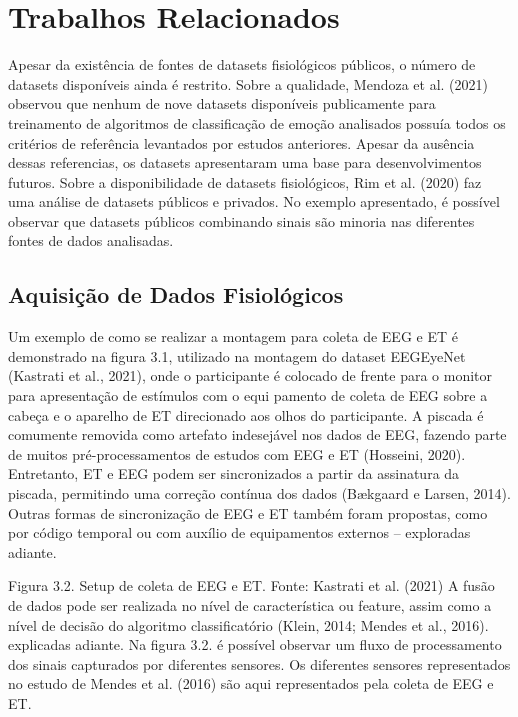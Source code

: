 \chapter{Trabalhos Relacionados}


Apesar da existência de fontes de datasets fisiológicos públicos, 
o número de datasets disponíveis ainda é restrito. Sobre a qualidade, 
Mendoza et al. (2021) observou que nenhum de nove datasets disponíveis publicamente para 
treinamento de algoritmos de classificação de emoção analisados possuía todos os critérios de 
referência levantados por estudos anteriores. Apesar da ausência dessas referencias, os datasets 
apresentaram uma base para desenvolvimentos futuros. Sobre a disponibilidade de datasets fisiológicos,
Rim et al. (2020) faz uma análise de datasets públicos e privados.
 No exemplo apresentado, 
 é possível observar que datasets públicos combinando sinais são minoria nas diferentes fontes de dados analisadas. 


\section{Aquisição de Dados Fisiológicos}

Um exemplo de como se realizar a montagem para coleta de EEG e ET é demonstrado na figura 3.1, utilizado na montagem do dataset EEGEyeNet (Kastrati et al., 2021),
onde o participante é colocado de frente para o monitor para apresentação de estímulos com o equi
pamento de coleta de EEG sobre a cabeça e o aparelho de ET direcionado aos olhos do participante. A piscada é comumente
removida como artefato indesejável nos dados de EEG, fazendo parte de muitos pré-processamentos de estudos com EEG e ET (Hosseini, 2020).
Entretanto, ET e EEG podem ser sincronizados a partir da assinatura da piscada, permitindo uma correção contínua dos dados (Bækgaard e Larsen, 2014). 
Outras formas de sincronização de EEG e ET também foram propostas, como por código temporal ou com auxílio de equipamentos externos – exploradas adiante. 
 
Figura 3.2. Setup de coleta de EEG e ET. Fonte: Kastrati et al. (2021)
A fusão de dados pode ser realizada no nível de característica ou feature,
assim como a nível de decisão do algoritmo classificatório (Klein, 2014; Mendes et al., 2016).  explicadas adiante.
      Na figura 3.2. é possível observar um fluxo de processamento dos sinais capturados por diferentes sensores.  Os diferentes 
      sensores representados no estudo de Mendes et al. (2016) são aqui representados pela coleta de EEG e ET.
 

